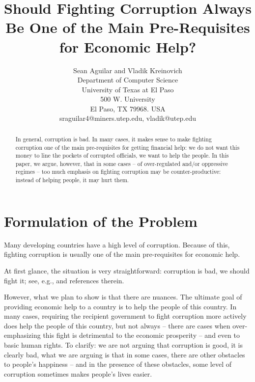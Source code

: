 \documentclass{article}
\begin{document}
\title{Should Fighting Corruption Always Be One of the Main
Pre-Requisites for Economic Help?}
\author{Sean Aguilar and Vladik Kreinovich\\
Department of Computer Science\\
University of Texas at El Paso\\
500 W. University\\El Paso, TX 79968. USA\\sraguilar4@miners.utep.edu, vladik@utep.edu}
\date{}
\maketitle

\begin{abstract}
In general, corruption is bad. In many cases, it makes sense to make fighting corruption one of the main pre-requisites for getting financial help: we do not want this money to line the pockets of corrupted officials, we want to help the people. In this paper, we argue, however, that in some cases -- of over-regulated and/or oppressive regimes -- too much emphasis on fighting corruption may be counter-productive: instead of helping people, it may hurt them.
\end{abstract}

\section{Formulation of the Problem}

 Many developing countries have a high level of corruption. Because of this, fighting corruption is usually one of the main pre-requisites for economic help.
\medskip

 At first glance, the situation is very straightforward: corruption is bad, we should fight it; see, e.g., \cite{Jain 2001} and references therein.

However, what we plan to show is that there are nuances. The ultimate goal of providing economic help to a country is to help the people of this country. In many cases, requiring the recipient government to fight corruption more actively does help the people of this country, but not always -- there are cases when over-emphasizing this fight is detrimental to the economic prosperity -- and even to basic human rights. To clarify: we are not arguing that corruption is good, it is clearly bad, what we are arguing is that in some cases, there are other obstacles to people's happiness -- and in the presence of these obstacles, some level of corruption sometimes makes people's lives easier.
\medskip
\end{document}
